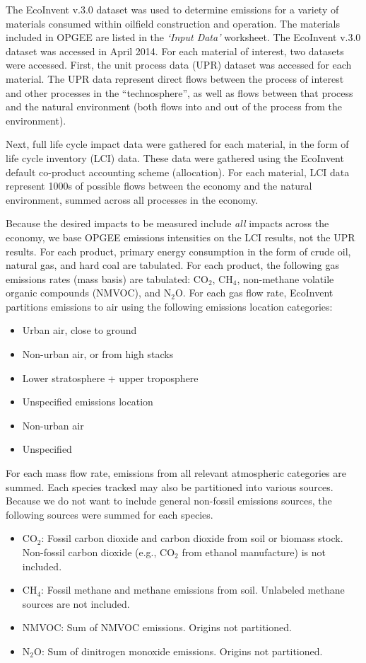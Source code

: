 \documentclass[11pt]{report}
\newcommand{\marg}[1]{{\footnotesize\textit{\textcolor{stanford}{'#1'}}}}
\newcommand{\marginnote}[1]{\marginpar{\marg{#1}}}
\newcommand{\sheet}[1]{\textit{`{#1}'}}
\begin{document}
{{{{The EcoInvent v.3.0 dataset was used to determine emissions for a variety of materials consumed within oilfield construction and operation. \marginnote{Embodied Emissions 1.3} The materials included in OPGEE are listed in the \sheet{Input Data} worksheet. The EcoInvent v.3.0 dataset was accessed in April 2014. For each material of interest, two datasets were accessed. First, the unit process data (UPR) dataset was accessed for each material. The UPR data represent direct flows between the process of interest and other processes in the ``technosphere'', as well as flows between that process and the natural environment (both flows into and out of the process from the environment).

Next, full life cycle impact data were gathered for each material, in the form of life cycle inventory (LCI) data. These data were gathered using the EcoInvent default co-product accounting scheme (allocation). For each material, LCI data represent 1000s of possible flows between the economy and the natural environment, summed across all processes in the economy. 

Because the desired impacts to be measured include \emph{all} impacts across the economy, we base OPGEE emissions intensities on the LCI results, not the UPR results. For each product, primary energy consumption in the form of crude oil, natural gas, and hard coal are tabulated. For each product, the following gas emissions rates (mass basis) are tabulated: \marginnote{Embodied Emissions 1.3} CO$_2$, CH$_4$, non-methane volatile organic compounds (NMVOC), and N$_2$O. For each gas flow rate, EcoInvent partitions emissions to air using the following emissions location categories:
\begin{itemize}
\item Urban air, close to ground
\item Non-urban air, or from high stacks
\item Lower stratosphere + upper troposphere
\item Unspecified emissions location
\item Non-urban air
\item Unspecified
\end{itemize}

For each mass flow rate, emissions from all relevant atmospheric categories are summed. Each species tracked may also be partitioned into various sources. Because we do not want to include general non-fossil emissions sources, the following sources were summed for each species.
\begin{itemize}
\item CO$_2$: Fossil carbon dioxide and carbon dioxide from soil or biomass stock. Non-fossil carbon dioxide (e.g., CO$_2$ from ethanol manufacture) is not included.
\item CH$_4$: Fossil methane and methane emissions from soil. Unlabeled methane sources are not included.
\item NMVOC: Sum of NMVOC emissions. Origins not partitioned.
\item N$_2$O: Sum of dinitrogen monoxide emissions. Origins not partitioned.
\end{itemize}

}}}}
\end{document}

